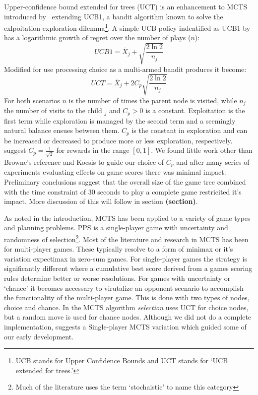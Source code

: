 \documentclass[letterpaper]{article}
\begin{document}
Upper-confidence bound extended for trees (UCT) is an enhancement to MCTS introduced by~\cite{kocsis2006improved} extending UCB1, a bandit algorithm known to solve the exlpoitation-exploration dilemma\footnote{UCB stands for Upper Confidence Bounds and UCT stands for `UCB extended for trees.'}. A simple UCB policy indentified as UCB1 by~\cite{auer2002finite} has a logarithmic growth of regret over the number of plays ($n$):
\begin{equation} \label{eq:UCB1}
UCB1 = \overline{X}_j + \sqrt{\frac{2\ln{2}}{n_j}}
\end{equation}
Modified for use processing choice as a multi-armed bandit produces it become:
\begin{equation} \label{eq:UCT}
UCT = \overline{X}_j + 2C_p\sqrt{\frac{2\ln{2}}{n_j}}
\end{equation}
For both scenarios $n$ is the number of times the parent node is visited, while $n_j$ the number of visits to the child $_j$ and $C_p > 0$ is a constant. Exploitation is the first term while exploration is managed by the second term and a seemingly natural balance ensues between them. $C_p$ is the constant in exploration and can be increased or decreased to produce more or less exploration, respectively. ~\cite{kocsis2006improved} suggest $C_p = \frac{1}{\sqrt{2}}$ for rewards in the range $[0,1]$. We found little work other than Browne's reference and Kocsis to guide our choice of $C_p$ and after many series of experiments evaluating effects on game scores there was minimal impact. Preliminary conclusions  suggest that the overall size of the game tree combined with the time constraint of 30 seconds to play a complete game restricited it's impact. More discussion of this will follow in section {\bf(section)}.

As noted in the introduction, MCTS has been applied to a variety of game types and planning problems. PPS is a single-player game with uncertainty and randomness of selection\footnote{Much of the literature uses the term `stochaistic' to name this category}. Most of the literature and research in MCTS has been for multi-player games. These typically resolve to a form of minimax or it's variation expectimax in zero-sum games. For single-player games the strategy is significantly different where a cumulative best score derived from a games scoring rules determine better or worse resolutions. For games with uncertainty or `chance' it becomes necessary to virutalize an opponent scenario to accomplish the functionality of the multi-player game. This is done with two types of nodes, choice and chance. In the MCTS algorithm \emph{selection} uses UCT for choice nodes, but a random move is used for chance nodes. Although we did not do a complete implementation, \cite{schadd2012single} suggests a Single-player MCTS variation which guided some of our early development.
\end{document}
